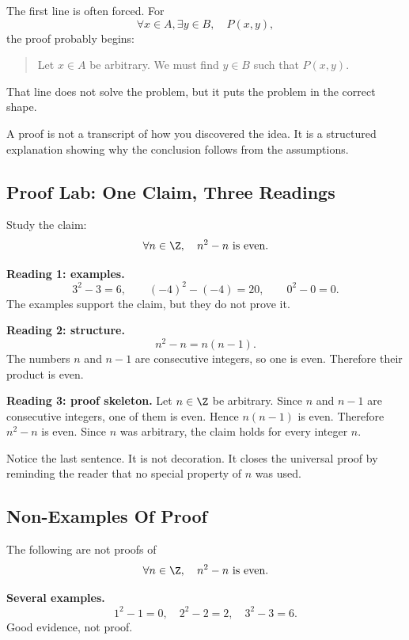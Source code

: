 The first line is often forced. For
\[
\forall x\in A,\exists y\in B,\quad P(x,y),
\]
the proof probably begins:

\begin{quote}
Let $x\in A$ be arbitrary. We must find $y\in B$ such that $P(x,y)$.
\end{quote}

That line does not solve the problem, but it puts the problem in the correct shape.

\begin{formalbox}
A proof is not a transcript of how you discovered the idea. It is a structured explanation showing why the conclusion follows from the assumptions.
\end{formalbox}

\subsection{Proof Lab: One Claim, Three Readings}

\begin{labbox}
Study the claim:
\[
\forall n\in\Z,\quad n^2-n\text{ is even}.
\]

\textbf{Reading 1: examples.}
\[
3^2-3=6,\qquad (-4)^2-(-4)=20,\qquad 0^2-0=0.
\]
The examples support the claim, but they do not prove it.

\textbf{Reading 2: structure.}
\[
n^2-n=n(n-1).
\]
The numbers $n$ and $n-1$ are consecutive integers, so one is even. Therefore their product is even.

\textbf{Reading 3: proof skeleton.}
Let $n\in\Z$ be arbitrary. Since $n$ and $n-1$ are consecutive integers, one of them is even. Hence $n(n-1)$ is even. Therefore $n^2-n$ is even. Since $n$ was arbitrary, the claim holds for every integer $n$.
\end{labbox}

Notice the last sentence. It is not decoration. It closes the universal proof by reminding the reader that no special property of $n$ was used.

\subsection{Non-Examples Of Proof}

The following are not proofs of
\[
\forall n\in\Z,\quad n^2-n\text{ is even}.
\]

\textbf{Several examples.}
\[
1^2-1=0,\quad 2^2-2=2,\quad 3^2-3=6.
\]
Good evidence, not proof.

